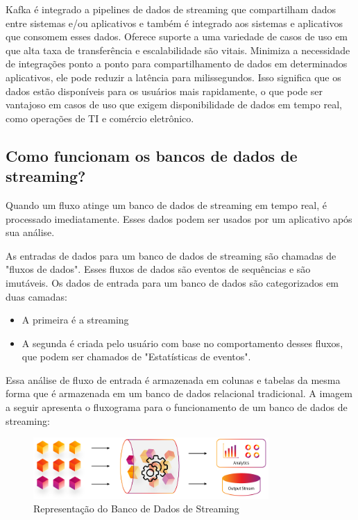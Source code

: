 \documentclass[a4paper,11pt]{article}
\begin{document}
Kafka é integrado a pipelines de dados de streaming que compartilham dados entre sistemas e/ou aplicativos e também é integrado aos sistemas e aplicativos que consomem esses dados. Oferece suporte a uma variedade de casos de uso em que alta taxa de transferência e escalabilidade são vitais. Minimiza a necessidade de integrações ponto a ponto para compartilhamento de dados em determinados aplicativos, ele pode reduzir a latência para milissegundos. Isso significa que os dados estão disponíveis para os usuários mais rapidamente, o que pode ser vantajoso em casos de uso que exigem disponibilidade de dados em tempo real, como operações de TI e comércio eletrônico. 

\subsection{Como funcionam os bancos de dados de streaming?}
Quando um fluxo atinge um banco de dados de streaming em tempo real, é processado imediatamente. Esses dados podem ser usados por um aplicativo após sua análise.

As entradas de dados para um banco de dados de streaming são chamadas de "fluxos de dados". Esses fluxos de dados são eventos de sequências e são imutáveis. Os dados de entrada para um banco de dados são categorizados em duas camadas: \vspace{-1em}
\begin{itemize}
	\item A primeira é a streaming
	\item A segunda é criada pelo usuário com base no comportamento desses fluxos, que podem ser chamados de "Estatísticas de eventos". 
\end{itemize}
	
Essa análise de fluxo de entrada é armazenada em colunas e tabelas da mesma forma que é armazenada em um banco de dados relacional tradicional. A imagem a seguir apresenta o fluxograma para o funcionamento de um banco de dados de streaming: 
\begin{figure}[H]
	\centering
	\includegraphics[width=0.8\textwidth]{imagem/BDStreaming}
	\caption{Representação do Banco de Dados de Streaming}
\end{figure}
\end{document}
